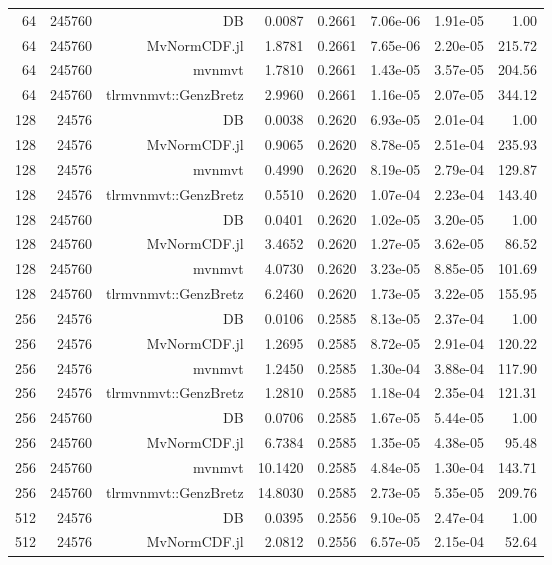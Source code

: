 \begin{tabular}{|r|r|r|r|r|r|r|r|}
  64 & 245760 & DB & 0.0087 & 0.2661 & 7.06e-06 & 1.91e-05 & 1.00 \\
  64 & 245760 & MvNormCDF.jl & 1.8781 & 0.2661 & 7.65e-06 & 2.20e-05 & 215.72 \\
  64 & 245760 & mvnmvt & 1.7810 & 0.2661 & 1.43e-05 & 3.57e-05 & 204.56 \\
  64 & 245760 & tlrmvnmvt::GenzBretz & 2.9960 & 0.2661 & 1.16e-05 & 2.07e-05 & 344.12 \\
  128 & 24576 & DB & 0.0038 & 0.2620 & 6.93e-05 & 2.01e-04 & 1.00 \\
  128 & 24576 & MvNormCDF.jl & 0.9065 & 0.2620 & 8.78e-05 & 2.51e-04 & 235.93 \\
  128 & 24576 & mvnmvt & 0.4990 & 0.2620 & 8.19e-05 & 2.79e-04 & 129.87 \\
  128 & 24576 & tlrmvnmvt::GenzBretz & 0.5510 & 0.2620 & 1.07e-04 & 2.23e-04 & 143.40 \\
  128 & 245760 & DB & 0.0401 & 0.2620 & 1.02e-05 & 3.20e-05 & 1.00 \\
  128 & 245760 & MvNormCDF.jl & 3.4652 & 0.2620 & 1.27e-05 & 3.62e-05 & 86.52 \\
  128 & 245760 & mvnmvt & 4.0730 & 0.2620 & 3.23e-05 & 8.85e-05 & 101.69 \\
  128 & 245760 & tlrmvnmvt::GenzBretz & 6.2460 & 0.2620 & 1.73e-05 & 3.22e-05 & 155.95 \\
  256 & 24576 & DB & 0.0106 & 0.2585 & 8.13e-05 & 2.37e-04 & 1.00 \\
  256 & 24576 & MvNormCDF.jl & 1.2695 & 0.2585 & 8.72e-05 & 2.91e-04 & 120.22 \\
  256 & 24576 & mvnmvt & 1.2450 & 0.2585 & 1.30e-04 & 3.88e-04 & 117.90 \\
  256 & 24576 & tlrmvnmvt::GenzBretz & 1.2810 & 0.2585 & 1.18e-04 & 2.35e-04 & 121.31 \\
  256 & 245760 & DB & 0.0706 & 0.2585 & 1.67e-05 & 5.44e-05 & 1.00 \\
  256 & 245760 & MvNormCDF.jl & 6.7384 & 0.2585 & 1.35e-05 & 4.38e-05 & 95.48 \\
  256 & 245760 & mvnmvt & 10.1420 & 0.2585 & 4.84e-05 & 1.30e-04 & 143.71 \\
  256 & 245760 & tlrmvnmvt::GenzBretz & 14.8030 & 0.2585 & 2.73e-05 & 5.35e-05 & 209.76 \\
  512 & 24576 & DB & 0.0395 & 0.2556 & 9.10e-05 & 2.47e-04 & 1.00 \\
  512 & 24576 & MvNormCDF.jl & 2.0812 & 0.2556 & 6.57e-05 & 2.15e-04 & 52.64 \\

\end{tabular}
